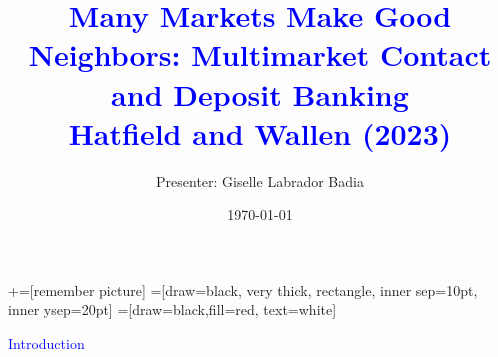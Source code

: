 \documentclass[notes,10.2pt, aspectratio=169]{beamer}
\title[]{\textcolor{blue}{Many Markets Make Good Neighbors: Multimarket Contact and Deposit Banking  \\ Hatfield and Wallen (2023)}}
\author{ Presenter: Giselle Labrador Badia}
\date{\today}
\begin{document}
\newcommand\marktopleft[1]{%
    \tikz[overlay,remember picture] 
        \node (marker-#1-a) at (-.3em,.3em) {};%
}
\newcommand\markbottomright[2]{%
    \tikz[overlay,remember picture] 
        \node (marker-#1-b) at (0em,0em) {};%
}
+=[remember picture] 
 =[draw=black, very thick, rectangle, inner sep=10pt, inner ysep=20pt]
 =[draw=black,fill=red, text=white]

\begin{frame}
  \maketitle
\end{frame}




  
  
  
   

\begin{frame}[noframenumbering]
  \textcolor{blue}{\huge{\centerline{Introduction}}}

\end{frame}
\end{document}
